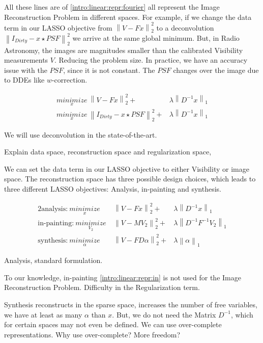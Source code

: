 All these lines are of \eqref{intro:linear:repr:fourier} all represent the Image Reconstruction Problem in different spaces. For example, if we change the data term in our LASSO objective from $\left \| V - Fx \right \|_2^2$ to a deconvolution $\left \| I_{Dirty} - x \star PSF \right \|_2^2$ we arrive at the same global minimum. But, in Radio Astronomy, the images are magnitudes smaller than the calibrated Visibility measurements $V$.
Reducing the problem size.
In practice, we have an accuracy issue with the $PSF$, since it is not constant. The $PSF$ changes over the image due to DDEs like $w$-correction.


\begin{equation} \label{intro:linear:repr:deconv}
\begin{split}
\underset{x}{minimize}\: \left \| V - Fx \right \|_2^2 + &\lambda \left \| D^{-1}x \right \|_1  \\
\underset{x}{minimize}\: \left \| I_{Dirty} - x \star PSF \right \|_2^2 + &\lambda \left \| D^{-1}x \right \|_1
\end{split}
\end{equation}

We will use deconvolution in the state-of-the-art.

Explain data space, reconstruction space and regularization space,

We can set the data term in our LASSO objective to either Visibility or image space. The reconstruction space has three possible design choices, which leads to three different LASSO objectives: Analysis, in-painting and synthesis.

\begin{alignat}{2}
\text{analysis:}\: \underset{x}{minimize}\:& \left \| V - Fx \right \|_2^2 + &\lambda \left \| D^{-1}x \right \|_1  \\
\text{in-painting:}\: \underset{V_2}{minimize}\:& \left \| V - MV_2 \right \|_2^2 + &\lambda \left \| D^{-1}F^{-1}V_2 \right \|_1 \label{intro:linear:repr:in} \\
\text{synthesis:}\: \underset{\alpha}{minimize}\:& \left \| V - FD\alpha \right \|_2^2 + &\lambda \left \| \alpha \right \|_1  
\end{alignat}

Analysis, standard formulation.

To our knowledge, in-painting \eqref{intro:linear:repr:in} is not used for the Image Reconstruction Problem. Difficulty in the Regularization term. 

Synthesis reconstructs in the sparse space, increases the number of free variables, we have at least as many $\alpha$ than $x$. But, we do not need the Matrix $D^{-1}$, which for certain spaces may not even be defined. We can use over-complete representations.
Why use over-complete? More freedom?




